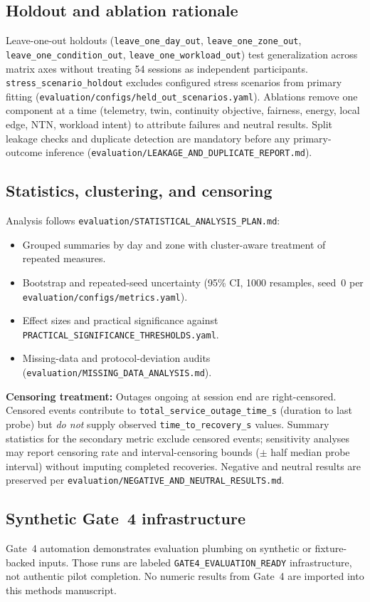 \subsection{Holdout and ablation rationale}
Leave-one-out holdouts (\texttt{leave\_one\_day\_out}, \texttt{leave\_one\_zone\_out}, \texttt{leave\_one\_condition\_out}, \texttt{leave\_one\_workload\_out}) test generalization across matrix axes without treating 54 sessions as independent participants.
\texttt{stress\_scenario\_holdout} excludes configured stress scenarios from primary fitting (\texttt{evaluation/configs/held\_out\_scenarios.yaml}).
Ablations remove one component at a time (telemetry, twin, continuity objective, fairness, energy, local edge, NTN, workload intent) to attribute failures and neutral results.
Split leakage checks and duplicate detection are mandatory before any primary-outcome inference (\texttt{evaluation/LEAKAGE\_AND\_DUPLICATE\_REPORT.md}).

\subsection{Statistics, clustering, and censoring}
Analysis follows \texttt{evaluation/STATISTICAL\_ANALYSIS\_PLAN.md}:
\begin{itemize}
  \item Grouped summaries by day and zone with cluster-aware treatment of repeated measures.
  \item Bootstrap and repeated-seed uncertainty (95\% CI, 1000 resamples, seed~0 per \texttt{evaluation/configs/metrics.yaml}).
  \item Effect sizes and practical significance against \texttt{PRACTICAL\_SIGNIFICANCE\_THRESHOLDS.yaml}.
  \item Missing-data and protocol-deviation audits (\texttt{evaluation/MISSING\_DATA\_ANALYSIS.md}).
\end{itemize}
\textbf{Censoring treatment:} Outages ongoing at session end are right-censored.
Censored events contribute to \texttt{total\_service\_outage\_time\_s} (duration to last probe) but \emph{do not} supply observed \texttt{time\_to\_recovery\_s} values.
Summary statistics for the secondary metric exclude censored events; sensitivity analyses may report censoring rate and interval-censoring bounds ($\pm$ half median probe interval) without imputing completed recoveries.
Negative and neutral results are preserved per \texttt{evaluation/NEGATIVE\_AND\_NEUTRAL\_RESULTS.md}.

\subsection{Synthetic Gate~4 infrastructure}
Gate~4 automation demonstrates evaluation plumbing on synthetic or fixture-backed inputs.
Those runs are labeled \texttt{GATE4\_EVALUATION\_READY} infrastructure, not authentic pilot completion.
No numeric results from Gate~4 are imported into this methods manuscript.
